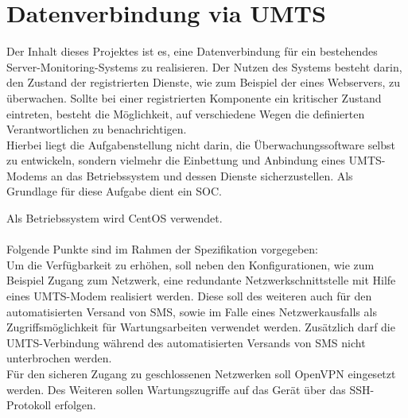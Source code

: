 \documentclass[Bachelorarbeit.tex]{subfiles}
\begin{document}
\section*{Datenverbindung via \ac{UMTS}}
Der Inhalt dieses Projektes ist es, eine Datenverbindung für ein bestehendes Server-Monitoring-Systems zu realisieren. 
Der Nutzen des Systems besteht darin, den Zustand der registrierten Dienste, wie zum Beispiel der eines Webservers, zu überwachen. 
Sollte bei einer registrierten Komponente ein kritischer Zustand eintreten, besteht die Möglichkeit, auf verschiedene Wegen die definierten Verantwortlichen zu benachrichtigen. \\
Hierbei liegt die Aufgabenstellung nicht darin, die Überwachungssoftware selbst zu entwickeln, sondern vielmehr die Einbettung und Anbindung eines \ac{UMTS}-Modems an das Betriebssystem und dessen Dienste sicherzustellen. 
Als Grundlage für diese Aufgabe dient ein \ac{SOC}.
\begin{comment}
Software-seitig wird CentOS als Betriebssystem verwendet.
\end{comment} 
Als Betriebssystem wird CentOS verwendet.\\
\\
Folgende Punkte sind im Rahmen der Spezifikation vorgegeben:\\
Um die Verfügbarkeit zu erhöhen, soll neben den Konfigurationen, wie zum Beispiel Zugang zum Netzwerk, eine redundante Netzwerkschnittstelle mit Hilfe eines \ac{UMTS}-Modem realisiert werden. 
Diese soll des weiteren auch für den automatisierten Versand von SMS, sowie im Falle eines Netzwerkausfalls als Zugriffsmöglichkeit für Wartungsarbeiten verwendet werden. 
Zusätzlich darf die \ac{UMTS}-Verbindung während des automatisierten Versands von SMS nicht unterbrochen werden. \\
Für den sicheren Zugang zu geschlossenen Netzwerken soll OpenVPN eingesetzt werden. 
Des Weiteren sollen Wartungszugriffe auf das Gerät über das \ac{SSH}-Protokoll  erfolgen.
\end{document}
